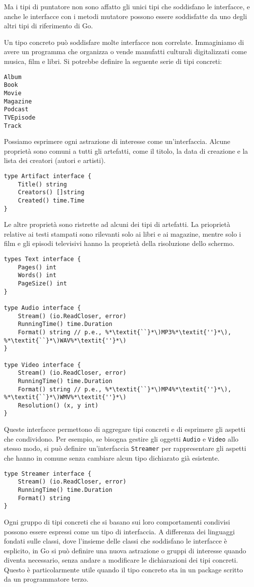 Ma i tipi di puntatore non sono affatto gli unici tipi che soddisfano le interfacce, e anche le interfacce con i metodi mutatore possono essere soddisfatte da uno degli altri tipi di riferimento di Go.

Un tipo concreto può soddisfare molte interfacce non correlate.
Immaginiamo di avere un programma che organizza o vende manufatti culturali digitalizzati come musica, film e libri.
Si potrebbe definire la seguente serie di tipi concreti:
\begin{lstlisting}[frame=single, label={lst:lstlisting6-3.4}]
Album
Book
Movie
Magazine
Podcast
TVEpisode
Track
\end{lstlisting}
Possiamo esprimere ogni astrazione di interesse come un'interfaccia.
Alcune proprietà sono comuni a tutti gli artefatti, come il titolo, la data di creazione e la lista dei creatori (autori e artisti).
\begin{lstlisting}[frame=single, label={lst:lstlisting6-3.5}]
type Artifact interface {
    Title() string
    Creators() []string
    Created() time.Time
}
\end{lstlisting}
Le altre proprietà sono ristrette ad alcuni dei tipi di artefatti.
La prioprietà relative ai testi stampati sono rilevanti solo ai libri e ai magazine, mentre solo i film e gli episodi televisivi hanno la proprietà della risoluzione dello schermo.
\begin{lstlisting}[frame=single, label={lst:lstlisting6-3.6}]
types Text interface {
    Pages() int
    Words() int
    PageSize() int
}

type Audio interface {
    Stream() (io.ReadCloser, error)
    RunningTime() time.Duration
    Format() string // p.e., %*\textit{``}*\)MP3%*\textit{''}*\), %*\textit{``}*\)WAV%*\textit{''}*\)
}

type Video interface {
    Stream() (io.ReadCloser, error)
    RunningTime() time.Duration
    Format() string // p.e., %*\textit{``}*\)MP4%*\textit{''}*\), %*\textit{``}*\)WMV%*\textit{''}*\)
    Resolution() (x, y int)
}
\end{lstlisting}
Queste interfacce permettono di aggregare tipi concreti e di esprimere gli aspetti che condividono.
Per esempio, se bisogna gestire gli oggetti \verb|Audio| e \verb|Video| allo stesso modo, si può definire un'interfaccia \verb|Streamer| per rappresentare gli aspetti che hanno in comune senza cambiare alcun tipo dichiarato già esistente.
\begin{lstlisting}[frame=single, label={lst:lstlisting6-3.7}]
type Streamer interface {
    Stream() (io.ReadCloser, error)
    RunningTime() time.Duration
    Format() string
}
\end{lstlisting}
Ogni gruppo di tipi concreti che si basano sui loro comportamenti condivisi possono essere espressi come un tipo di interfaccia.
A differenza dei linguaggi fondati sulle classi, dove l'insieme delle classi che soddisfano le interfacce è esplicito, in Go si può definire una nuova astrazione o gruppi di interesse quando diventa necessario, senza andare a modificare le dichiarazioni dei tipi concreti.
Questo è particolarmente utile quando il tipo concreto sta in un package scritto da un programmatore terzo.